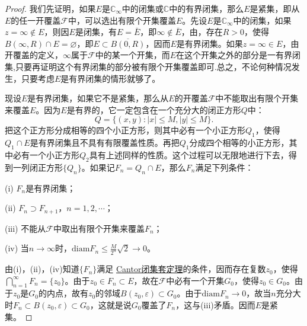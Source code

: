 \documentclass[../../main.tex]{subfiles}%
\begin{document}
\begin{proof}

我们先证明，如果\(E\)是\(\mathbb{C}_\infty\)中的闭集或\(\mathbb{C}\)中的有界闭集，那么\(E\)是紧集，即从\(E\)的任一开覆盖\(\mathscr{F}\)中，可以选出有限个开集覆盖\(E\)。先设\(E\)是\(\mathbb{C}_\infty\)中的闭集，如果\(z = \infty \notin E\)，则因\(E\)是闭集，有\(E = \bar{E}\)，即\(\infty \notin \bar{E}\)，由，存在\(R > 0\)，使得\(B(\infty, R) \cap E = \varnothing\)，即\(E \subset \overline{B(0, R)}\)，因而\(E\)是有界闭集。如果\(z = \infty \in E\)，由开覆盖的定义，\(\infty\)属于\(\mathscr{F}\)中的某一个开集，而\(E\)在这个开集之外的部分是一有界闭集,只要再证明这个有界闭集的部分被有限个开集覆盖即可.总之，不论何种情况发生，只要考虑\(E\)是有界闭集的情形就够了。

现设\(E\)是有界闭集，如果它不是紧集，那么从\(E\)的开覆盖\(\mathscr{F}\)中不能取出有限个开集来覆盖\(E\)。因为\(E\)是有界的，它一定包含在一个充分大的闭正方形\(Q\)中：
\[
Q = \{ (x, y) : | x | \leqslant M, | y | \leqslant M \}.
\]
把这个正方形分成相等的四个小正方形，则其中必有一个小正方形\(Q_1\)，使得\(Q_1 \cap E\)是有界闭集且不具有有限覆盖性质。再把\(Q_1\)分成四个相等的小正方形，其中必有一个小正方形\(Q_2\)具有上述同样的性质。这个过程可以无限地进行下去，得到一列闭正方形\(\{ Q_n \}\)。如果记\(F_n = Q_n \cap E\)，那么\(F_n\)满足下列条件：

(i) \(F_n\)是有界闭集；

(ii) \(F_n \supset F_{n + 1}\)，\(n = 1, 2, \cdots\)；

(iii) 不能从\(\mathscr{F}\)中取出有限个开集来覆盖\(F_n\)；

(iv) 当\(n \to \infty\)时，\(\mathrm{diam}F_n \leqslant \frac{M}{2^n} \sqrt{2} \to 0\)。

由(i)，(ii)，(iv)知道\(\{ F_n \}\)满足 \hyperref[theorem:复变函数--Cantor闭集套定理]{Cantor闭集套定理}的条件，因而存在复数\(z_0\)，使得\(\bigcap_{n = 1}^\infty F_n = \{ z_0 \}\)。由于\(z_0 \in F_n \subset E\)，故在\(\mathscr{F}\)中必有一个开集\(G_0\)，使得\(z_0 \in G_0\)。由于\(z_0\)是\(G_0\)的内点，故有\(z_0\)的邻域\(B(z_0, \varepsilon) \subset G_0\)。由于\(\mathrm{diam}F_n \to 0\)，故当\(n\)充分大时\(F_n \subset B(z_0, \varepsilon) \subset G_0\)，这就是说\(G_0\)覆盖了\(F_n\)，这与(iii)矛盾。因而\(E\)是紧集。


\end{proof}
\end{document}
